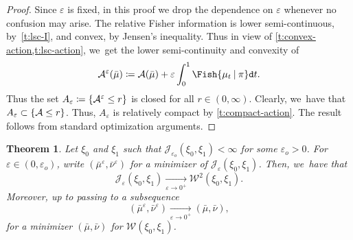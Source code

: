 \documentclass[JEP,XML,SOM,Unicode,published]{cedram}
\newtheorem{theorem}{Theorem}[section]
\theoremstyle{definition}
\theoremstyle{remark}
\DeclarePairedDelimiter{\set}{\lbrace}{\rbrace}
\newcommand{\given}[1][]{%
\nonscript\:#1\vert
\allowbreak
\nonscript\:
\mathopen{}}
\begin{document}
\begin{proof}
Since $\varepsilon$ is fixed, in this proof we drop the dependence on $\varepsilon$ whenever no confusion may arise.
The relative Fisher information is lower semi-continuous, by~\cref{t:lsc-I}, and convex, by Jensen's inequality.
Thus in view of \cref{t:convex-action,t:lsc-action}, we~get the lower semi-continuity and convexity of
\begin{equation}\label{e:action-epsilon}
\mathcal{A}^{\varepsilon}(\bar{\mu}) \coloneq \mathcal{A}(\bar{\mu}) + \varepsilon \int_{0}^{1} \Fish{ \mu_{t} \given \pi } \mathtt{d} t.
\end{equation}
Thus the set $A_{\varepsilon} \coloneq \set{ \mathcal{A}^{\varepsilon} \leq r }$ is closed for all $r \in (0,\infty)$.
Clearly, we~have that $A_{\varepsilon} \subset \set{\mathcal{A} \leq r}$.
Thus, $A_{\varepsilon}$ is relatively compact by \cref{t:compact-action}.
The result follows from standard optimization arguments.
\end{proof}

\begin{theorem}\label{t:gamma-convergence}
Let $\xi_{0}$ and $\xi_{1}$ such that $\mathcal{J}_{\varepsilon_{o}}(\xi_{0}, \xi_{1}) < \infty$ for some $\varepsilon_{o} > 0$.
For $\varepsilon \in (0,\varepsilon_{o})$, write $(\bar{\mu}^{\varepsilon}, \bar{\nu}^{\varepsilon})$ for a minimizer of $\mathcal{J}_{\varepsilon}(\xi_{0}, \xi_{1})$.
Then, we~have that
\begin{equation*}
\mathcal{J}_{\varepsilon}(\xi_{0}, \xi_{1}) \xrightarrow[\varepsilon \to 0^{+}]{} \mathcal{W}^{2}(\xi_{0}, \xi_{1}).
\end{equation*}
Moreover, up to passing to a subsequence
\begin{equation*}
(\bar{\mu}^{\varepsilon}, \bar{\nu}^{\varepsilon}) \xrightarrow[\varepsilon \to 0^{+}]{} (\bar{\mu}, \bar{\nu}),
\end{equation*}
for a minimizer $(\bar{\mu}, \bar{\nu})$ for $\mathcal{W}(\xi_{0}, \xi_{1})$.
\end{theorem}
\end{document}
